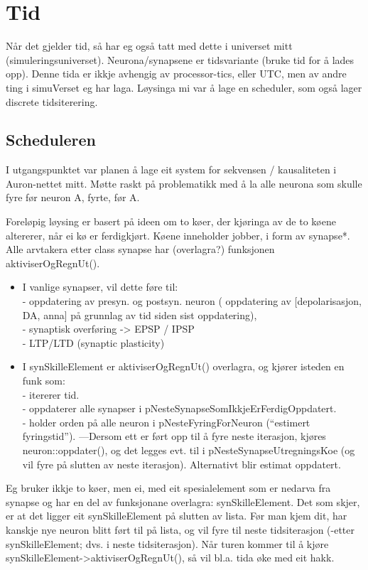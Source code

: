

\chapter{Tid}
Når det gjelder tid, så har eg også tatt med dette i universet mitt (simuleringsuniverset). Neurona/synapsene er tidsvariante (bruke tid for å lades opp). Denne tida er ikkje avhengig av processor-tics, eller UTC, men av andre ting i simuVerset eg har laga. Løysinga mi var å lage en scheduler, som også lager discrete tidsiterering.
\section{Scheduleren}
I utgangspunktet var planen å lage eit system for sekvensen / kausaliteten i Auron-nettet mitt. Møtte raskt på problematikk med å la alle neurona som skulle fyre før neuron A, fyrte, før A.

Foreløpig løysing er basert på ideen om to køer, der kjøringa av de to køene altererer, når ei kø er ferdigkjørt. Køene inneholder jobber, i form av synapse*. Alle arvtakera etter class synapse har (overlagra?) funksjonen aktiviserOgRegnUt(). 
\begin{itemize}
	\item I vanlige synapser, vil dette føre til:
		\\ - oppdatering av presyn. og postsyn. neuron ( oppdatering av [depolarisasjon, DA, anna] på grunnlag av tid siden sist oppdatering), 
		\\ - synaptisk overføring -> EPSP / IPSP
		\\ - LTP/LTD (synaptic plasticity)
	\item I synSkilleElement er aktiviserOgRegnUt() overlagra, og kjører isteden en funk som: 
		\\ - itererer tid. 
		\\ - oppdaterer alle synapser i pNesteSynapseSomIkkjeErFerdigOppdatert.
		\\ - holder orden på alle neuron i pNesteFyringForNeuron (``estimert fyringstid''). ---Dersom ett er ført opp til å fyre neste iterasjon, kjøres neuron::oppdater(), og det legges evt. til i pNesteSynapseUtregningsKoe (og vil fyre på slutten av neste iterasjon). Alternativt blir estimat oppdatert.
\end{itemize}
Eg bruker ikkje to køer, men ei, med eit spesialelement som er nedarva fra synapse og har en del av funksjonane overlagra: synSkilleElement. Det som skjer, er at det ligger eit synSkilleElement på slutten av lista. 
Før man kjem dit, har kanskje nye neuron blitt ført til på lista, og vil fyre til neste tidsiterasjon (-etter synSkilleElement; dvs. i neste tidsiterasjon). Når turen kommer til å kjøre synSkilleElement->aktiviserOgRegnUt(), så vil bl.a. tida øke med eit hakk.

